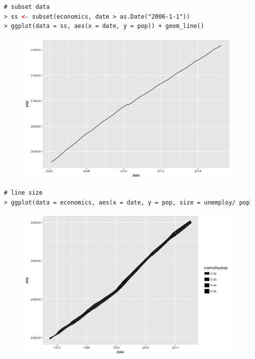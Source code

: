 \begin{lstlisting}[language=html]
# subset data
> ss <- subset(economics, date > as.Date("2006-1-1"))
> ggplot(data = ss, aes(x = date, y = pop)) + geom_line()
\end{lstlisting}
\begin{figure}[H]\begin{center}\includegraphics[scale=1 ]{ilu/bg126.png}\end{center}\end{figure}
\begin{lstlisting}[language=html]
# line size
> ggplot(data = economics, aes(x = date, y = pop, size = unemploy/ pop)) + geom_line()
\end{lstlisting}
\begin{figure}[H]\begin{center}\includegraphics[scale=1 ]{ilu/bg127.png}\end{center}\end{figure}
